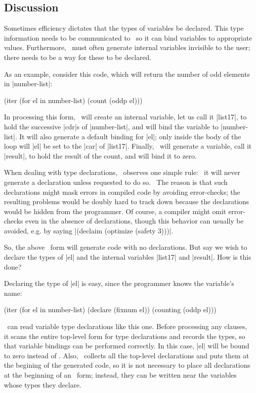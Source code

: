 \subsection{Discussion}

Sometimes efficiency dictates that the types of variables be declared.
This type information needs to be communicated to \iter\ so it can
bind variables to appropriate values.  Furthermore, \iter\ must often
generate internal variables invisible to the user; there needs to be a
way for these to be declared.

As an example, consider this code, which will return the number of
odd elements in |number-list|:
\begin{program}
(iter (for el in number-list)
      (count (oddp el)))
\end{program}
In processing this form,
\iter\ will create an internal variable, let us call it |list17|, to
hold the successive |cdr|s of |number-list|, and
will bind the variable to |number-list|.  It will also generate a
default binding for |el|; only inside the body of the loop will |el|
be set to the |car| of |list17|.  Finally, \iter\ will generate a
variable, call it |result|, to hold the result of the count, and will
bind it to zero.

When dealing with type declarations, \iter\ observes one simple rule:
~it will never generate a declaration unless requested to do so.~  The
reason is that such declarations might mask errors in compiled code by
avoiding error-checks; the resulting problems would be doubly hard to
track down because the declarations would be hidden from the
programmer.  Of course, a compiler might omit error-checks even in the
absence of declarations, though this behavior can usually be avoided,
e.g. by saying |(declaim (optimize (safety 3)))|.

So, the above \iter\ form will generate code with no declarations.
But say we wish to declare the types of |el| and the internal
variables |list17| and |result|.  How is this done?

Declaring the type of |el| is easy, since the programmer knows
the variable's name:
\begin{program}
(iter (for el in number-list)
      (declare (fixnum el))
      (counting (oddp el)))
\end{program}
\iter\ can read variable type declarations like this one.  Before
processing any clauses, it scans the entire top-level form for type
declarations
and records the types, so that variable bindings can be performed
correctly.  In this case, |el| will be bound to zero
instead of \nil.  Also, \iter\ collects all the top-level declarations
and puts them at the begining of the generated code, so it is not
necessary to place all declarations at the beginning of an \iter\
form; instead, they can be written near the variables whose types they
declare.


